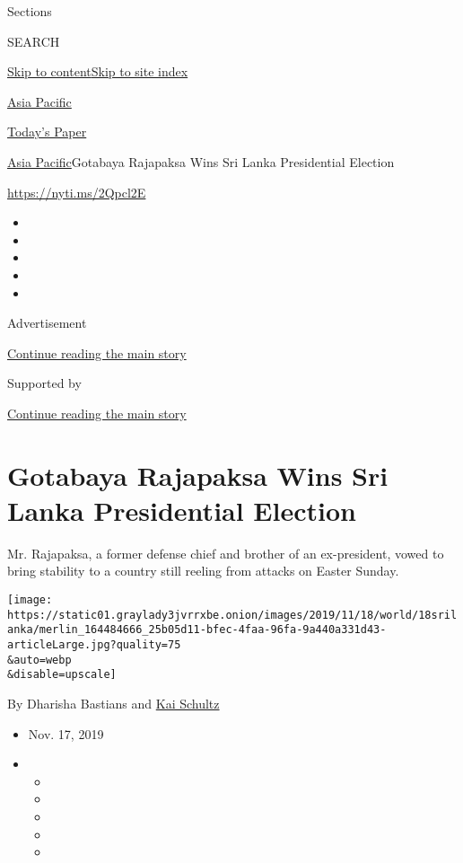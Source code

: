 Sections

SEARCH

\protect\hyperlink{site-content}{Skip to
content}\protect\hyperlink{site-index}{Skip to site index}

\href{https://www.nytimes3xbfgragh.onion/section/world/asia}{Asia
Pacific}

\href{https://myaccount.nytimes3xbfgragh.onion/auth/login?response_type=cookie\&client_id=vi}{}

\href{https://www.nytimes3xbfgragh.onion/section/todayspaper}{Today's
Paper}

\href{/section/world/asia}{Asia Pacific}\textbar{}Gotabaya Rajapaksa
Wins Sri Lanka Presidential Election

\url{https://nyti.ms/2Qpcl2E}

\begin{itemize}
\item
\item
\item
\item
\item
\end{itemize}

Advertisement

\protect\hyperlink{after-top}{Continue reading the main story}

Supported by

\protect\hyperlink{after-sponsor}{Continue reading the main story}

\hypertarget{gotabaya-rajapaksa-wins-sri-lanka-presidential-election}{%
\section{Gotabaya Rajapaksa Wins Sri Lanka Presidential
Election}\label{gotabaya-rajapaksa-wins-sri-lanka-presidential-election}}

Mr. Rajapaksa, a former defense chief and brother of an ex-president,
vowed to bring stability to a country still reeling from attacks on
Easter Sunday.

\texttt{[image: https://static01.graylady3jvrrxbe.onion/images/2019/11/18/world/18srilanka/merlin\_164484666\_25b05d11-bfec-4faa-96fa-9a440a331d43-articleLarge.jpg?quality=75\\\&auto=webp\\\&disable=upscale]}

By Dharisha Bastians and
\href{https://www.nytimes3xbfgragh.onion/by/kai-schultz}{Kai Schultz}

\begin{itemize}
\item
  Nov. 17, 2019
\item
  \begin{itemize}
  \item
  \item
  \item
  \item
  \item
  \end{itemize}
\end{itemize}

